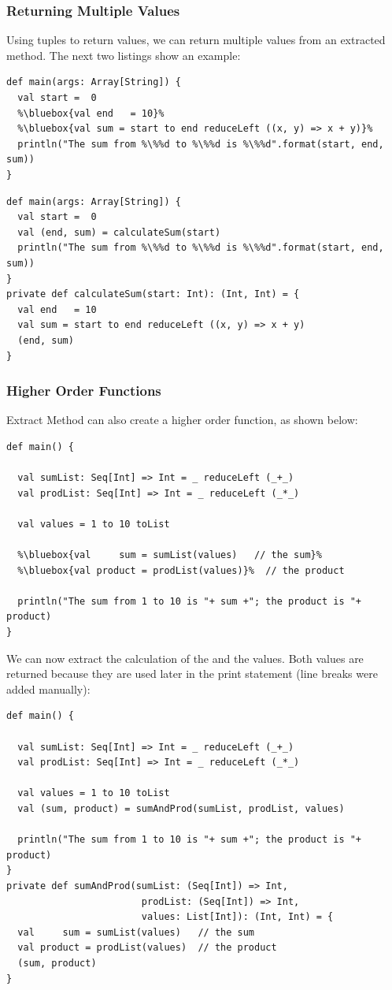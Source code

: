 \documentclass[10pt,a4paper,oneside]{scrreprt}
\begin{document}
\subsubsection{Returning Multiple Values}

Using tuples to return values, we can return multiple values from an extracted method. The next two listings show an example:

\begin{lstlisting}    
def main(args: Array[String]) {
  val start =  0
  %\bluebox{val end   = 10}%
  %\bluebox{val sum = start to end reduceLeft ((x, y) => x + y)}%
  println("The sum from %\%%d to %\%%d is %\%%d".format(start, end, sum))
}
\end{lstlisting}

\begin{lstlisting}        
def main(args: Array[String]) {
  val start =  0
  val (end, sum) = calculateSum(start)
  println("The sum from %\%%d to %\%%d is %\%%d".format(start, end, sum))
}
private def calculateSum(start: Int): (Int, Int) = {
  val end   = 10
  val sum = start to end reduceLeft ((x, y) => x + y)
  (end, sum)
}
\end{lstlisting}

\subsubsection{Higher Order Functions}

Extract Method can also create a higher order function, as shown below:

\begin{lstlisting}  
def main() {
  
  val sumList: Seq[Int] => Int = _ reduceLeft (_+_)
  val prodList: Seq[Int] => Int = _ reduceLeft (_*_)
  
  val values = 1 to 10 toList
  
  %\bluebox{val     sum = sumList(values)   // the sum}%
  %\bluebox{val product = prodList(values)}%  // the product

  println("The sum from 1 to 10 is "+ sum +"; the product is "+ product)
}
\end{lstlisting}

We can now extract the calculation of the  and the  values. Both values are returned because they are used later in the print statement (line breaks were added manually):

\begin{lstlisting}
def main() {
  
  val sumList: Seq[Int] => Int = _ reduceLeft (_+_)
  val prodList: Seq[Int] => Int = _ reduceLeft (_*_)
  
  val values = 1 to 10 toList
  val (sum, product) = sumAndProd(sumList, prodList, values)

  println("The sum from 1 to 10 is "+ sum +"; the product is "+ product)
}
private def sumAndProd(sumList: (Seq[Int]) => Int, 
                        prodList: (Seq[Int]) => Int, 
                        values: List[Int]): (Int, Int) = {
  val     sum = sumList(values)   // the sum
  val product = prodList(values)  // the product
  (sum, product)
}
\end{lstlisting}
\end{document}
